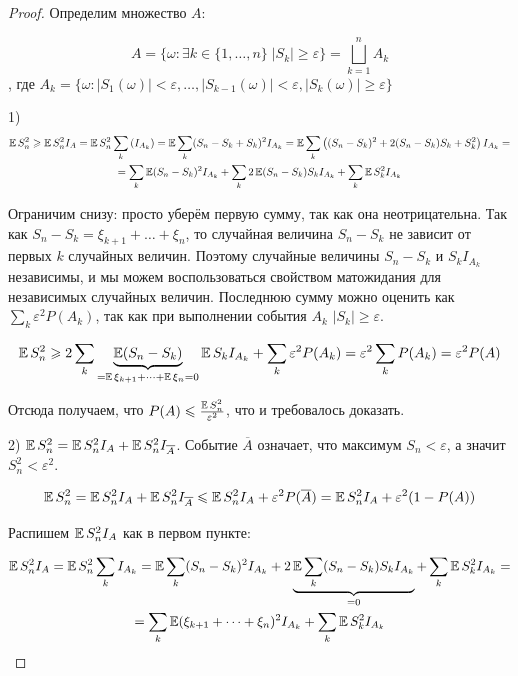 \begin{proof}

Определим множество $A$:

\[A = \{ \omega : \exists k \in \{1, \dots, n\} \; 
|S_k| \geqslant \varepsilon\} = \bigsqcup_{k = 1}^n A_k \], где 
\( A_k = \{ \omega : |S_1(\omega)| < \varepsilon, \dots, 
|S_{k - 1}(\omega)| < \varepsilon, |S_k(\omega)| \geqslant \varepsilon \} \)

1) 
\begin{multline*}
\operatorname{\mathbb{E}} S_n^2 \geqslant \operatorname{\mathbb{E}} S_n^2 I_A = \operatorname{\mathbb{E}} S_n^2 \sum_k
\left( I_{A_k} \right) = \operatorname{\mathbb{E}} \sum_k (S_n - S_k + S_k)^2 I_{A_k} = 
\operatorname{\mathbb{E}} \sum_k \left( (S_n - S_k)^2 + 2(S_n - S_k) S_k + S_k^2 \right) I_{A_k} = \\
= \sum_k \operatorname{\mathbb{E}} (S_n - S_k)^2 I_{A_k} + \sum_k 2 \operatorname{\mathbb{E}} (S_n - S_k) S_k I_{A_k} +
\sum_k \operatorname{\mathbb{E}} S_k^2 I_{A_k}
\end{multline*}

Ограничим снизу: просто уберём первую сумму, так как она неотрицательна. 
Так как \( S_n - S_k = \xi_{k + 1} + \dots + \xi_n \), то случайная величина 
$S_n - S_k$ не зависит от первых $k$ случайных величин. Поэтому случайные величины
$S_n - S_k$ и $S_k I_{A_k}$ независимы, и мы можем воспользоваться свойством матожидания
для независимых случайных величин. Последнюю сумму можно оценить как 
$\sum_k \varepsilon^2 P(A_k)$,
так как при выполнении события $A_k$ $|S_k| \geqslant \varepsilon$.

\[
\operatorname{\mathbb{E}} S_n^2 \geqslant 2 \sum_k 
\underbrace{\operatorname{\mathbb{E}} (S_n - S_k)}_{= \operatorname{\mathbb{E}} \xi_{k + 1} + \dots + \operatorname{\mathbb{E}} \xi_n = 0} 
\operatorname{\mathbb{E}} S_k I_{A_k} + \sum_k \varepsilon^2 P(A_k) = \varepsilon^2 \sum_k P(A_k) = 
\varepsilon^2 P(A)
\]

Отсюда получаем, что \( P(A) \leqslant \frac{\operatorname{\mathbb{E}} S_n^2}{\varepsilon^2} \), что и требовалось
доказать.

2)
\( \operatorname{\mathbb{E}} S_n^2 = \operatorname{\mathbb{E}} S_n^2 I_A + \operatorname{\mathbb{E}} S_n^2 I_{\overline{A}} \). Событие $\overline{A}$ означает,
что максимум $S_n < \varepsilon$, а значит $S_n^2 < \varepsilon^2$.

\[ \operatorname{\mathbb{E}} S_n^2 = \operatorname{\mathbb{E}} S_n^2 I_A + \operatorname{\mathbb{E}} S_n^2 I_{\overline{A}} \leqslant \operatorname{\mathbb{E}} S_n^2 I_A +
\varepsilon^2 P(\overline{A}) = \operatorname{\mathbb{E}} S_n^2 I_A + \varepsilon^2 (1 - P(A)) \]

Распишем $\operatorname{\mathbb{E}} S_n^2 I_A$ как в первом пункте:

\begin{multline*}
\operatorname{\mathbb{E}} S_n^2 I_A  = \operatorname{\mathbb{E}} S_n^2 \sum_k I_{A_k} = \operatorname{\mathbb{E}} \sum_k (S_n - S_k)^2 I_{A_k} +
2 \underbrace{\operatorname{\mathbb{E}} \sum_k (S_n - S_k) S_k I_{A_k}}_{= 0} + \sum_k \operatorname{\mathbb{E}} S_k^2 I_{A_k} = \\
= \sum_k \operatorname{\mathbb{E}} (\xi_{k + 1} + \dots + \xi_n)^2 I_{A_k} + \sum_k \operatorname{\mathbb{E}} S_k^2 I_{A_k}
\end{multline*}


\end{proof}
